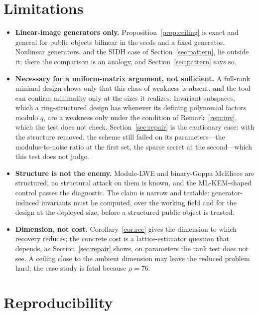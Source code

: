 \documentclass[11pt]{article}
\makeatletter
\theoremstyle{remark}
\DeclareRobustCommand{\_}{%
  \edef\@tempa{\ttdefault}%
  \ifx\f@family\@tempa\char95 \else\textunderscore\fi\penalty300\relax}
\makeatother
\begin{document}
\section{Limitations}\label{sec:limits}

\begin{itemize}
\item \textbf{Linear-image generators only.} Proposition~\ref{prop:ceiling} is exact and general for public objects
  bilinear in the seeds and a fixed generator. Nonlinear generators, and the SIDH case of Section~\ref{sec:pattern}, lie
  outside it; there the comparison is an analogy, and Section~\ref{sec:pattern} says so.
\item \textbf{Necessary for a uniform-matrix argument, not sufficient.} A full-rank minimal design shows only that this
  class of weakness is absent, and the tool can confirm minimality only at the sizes it realizes. Invariant subspaces,
  which a ring-structured design has whenever its defining polynomial factors modulo $q$, are a weakness only under the
  condition of Remark~\ref{rem:inv}, which the test does not check. Section~\ref{sec:repair} is the cautionary case: with
  the structure removed, the scheme still failed on its parameters---the modulus-to-noise ratio at the first set, the
  sparse secret at the second---which this test does not judge.
\item \textbf{Structure is not the enemy.} Module-LWE and binary-Goppa McEliece are structured, no structural attack on
  them is known, and the ML-KEM-shaped control passes the diagnostic. The claim is narrow and testable: generator-induced invariants must be
  computed, over the working field and for the design at the deployed size, before a structured public object is
  trusted.
\item \textbf{Dimension, not cost.} Corollary~\ref{cor:rec} gives the dimension to which recovery reduces; the concrete
  cost is a lattice-estimator question that depends, as Section~\ref{sec:repair} shows, on parameters the rank test does
  not see. A ceiling close to the ambient dimension may leave the reduced problem hard; the case study is fatal because
  $\rho=76$.
\end{itemize}

\section{Reproducibility}\label{sec:repro}
\end{document}
